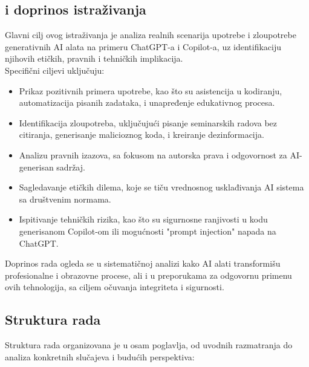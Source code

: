 \subsection{  i doprinos istraživanja}
\justifying
Glavni cilj ovog istraživanja je analiza realnih scenarija upotrebe i zloupotrebe generativnih AI alata na primeru ChatGPT-a i Copilot-a, uz identifikaciju njihovih etičkih, pravnih i tehničkih implikacija. \\
Specifični ciljevi uključuju:
{\small
\begin{itemize}
    \item Prikaz pozitivnih primera upotrebe, kao što su asistencija u kodiranju, automatizacija pisanih zadataka, i unapređenje edukativnog procesa.
    \item Identifikacija zloupotreba, uključujući pisanje seminarskih radova bez citiranja, generisanje malicioznog koda, i kreiranje dezinformacija.
    \item Analizu pravnih izazova, sa fokusom na autorska prava i odgovornost za AI-generisan sadržaj.
    \item Sagledavanje etičkih dilema, koje se tiču vrednosnog usklađivanja AI sistema sa društvenim normama.
    \item Ispitivanje tehničkih rizika, kao što su sigurnosne ranjivosti u kodu generisanom Copilot-om ili mogućnosti "prompt injection" napada na ChatGPT.
\end{itemize}
}
\par\noindent
Doprinos rada ogleda se u sistematičnoj analizi kako AI alati transformišu profesionalne i obrazovne procese, ali i u preporukama za odgovornu primenu ovih tehnologija, sa ciljem očuvanja integriteta i sigurnosti.

\subsection{Struktura rada}
\justifying
Struktura rada organizovana je u osam poglavlja, od uvodnih razmatranja do analiza konkretnih slučajeva i budućih perspektiva:


